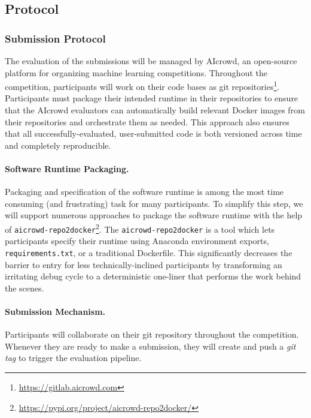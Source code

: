 \subsection{Protocol}

\subsubsection{Submission Protocol}
\label{subsec:sub_protocol}
The evaluation of the submissions will be managed by AIcrowd, an open-source platform for organizing machine learning competitions. 
Throughout the competition, participants will work on their code bases as git repositories\footnote{\url{https://gitlab.aicrowd.com}}. 
Participants must package their intended runtime in their repositories to ensure that the AIcrowd evaluators can automatically build relevant Docker images from their repositories and orchestrate them as needed. 
This approach also ensures that all successfully-evaluated, user-submitted code is both versioned across time and completely reproducible. 

\paragraph{Software Runtime Packaging.}
Packaging and specification of the software runtime is among the most time consuming (and frustrating) task for many participants. 
To simplify this step, we will support numerous approaches to package the software runtime with the help of \texttt{aicrowd-repo2docker}\footnote{\url{https://pypi.org/project/aicrowd-repo2docker/}}. 
The \texttt{aicrowd-repo2docker} is a tool which lets participants specify their runtime using Anaconda environment exports, \texttt{requirements.txt}, or a traditional Dockerfile. 
This significantly decreases the barrier to entry for less technically-inclined participants by transforming an irritating debug cycle to a deterministic one-liner that performs the work behind the scenes. 

\paragraph{Submission Mechanism.}
Participants will collaborate on their git repository throughout the competition.
Whenever they are ready to make a submission, they will create and push a \textit{git tag} to trigger the evaluation pipeline. %

